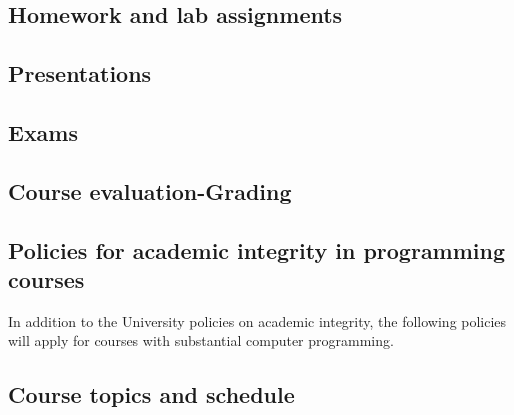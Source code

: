 

%


\ifhw
\subsection*{Homework and lab assignments}
 
\fi

\subsection*{Presentations}


\subsection*{Exams}





%


\subsection*{Course evaluation-Grading} 


\subsection*{Policies for academic integrity in programming courses}
In addition to the University policies on academic integrity, the following policies will apply for courses with substantial computer programming.



\newpage 

\subsection*{Course topics and schedule}





